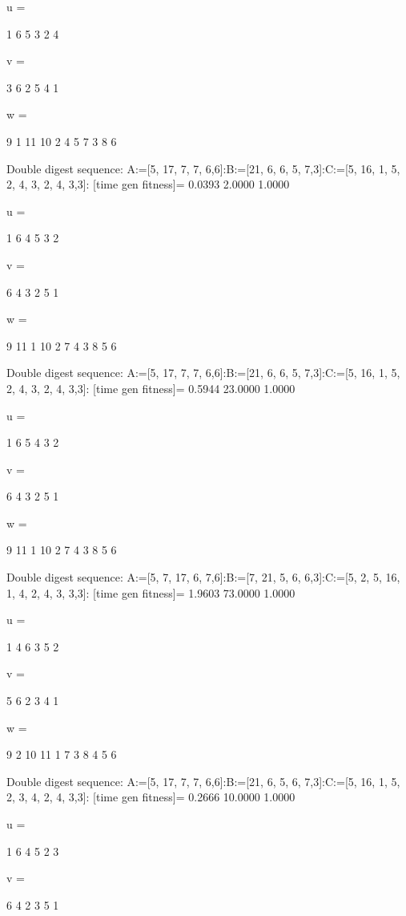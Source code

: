 u =

     1     6     5     3     2     4


v =

     3     6     2     5     4     1


w =

     9     1    11    10     2     4     5     7     3     8     6

Double digest sequence:
A:=[5, 17, 7, 7, 6,6]:B:=[21, 6, 6, 5, 7,3]:C:=[5, 16, 1, 5, 2, 4, 3, 2, 4, 3,3]:
[time gen fitness]=
    0.0393    2.0000    1.0000


u =

     1     6     4     5     3     2


v =

     6     4     3     2     5     1


w =

     9    11     1    10     2     7     4     3     8     5     6

Double digest sequence:
A:=[5, 17, 7, 7, 6,6]:B:=[21, 6, 6, 5, 7,3]:C:=[5, 16, 1, 5, 2, 4, 3, 2, 4, 3,3]:
[time gen fitness]=
    0.5944   23.0000    1.0000


u =

     1     6     5     4     3     2


v =

     6     4     3     2     5     1


w =

     9    11     1    10     2     7     4     3     8     5     6

Double digest sequence:
A:=[5, 7, 17, 6, 7,6]:B:=[7, 21, 5, 6, 6,3]:C:=[5, 2, 5, 16, 1, 4, 2, 4, 3, 3,3]:
[time gen fitness]=
    1.9603   73.0000    1.0000


u =

     1     4     6     3     5     2


v =

     5     6     2     3     4     1


w =

     9     2    10    11     1     7     3     8     4     5     6

Double digest sequence:
A:=[5, 17, 7, 7, 6,6]:B:=[21, 6, 5, 6, 7,3]:C:=[5, 16, 1, 5, 2, 3, 4, 2, 4, 3,3]:
[time gen fitness]=
    0.2666   10.0000    1.0000


u =

     1     6     4     5     2     3


v =

     6     4     2     3     5     1


